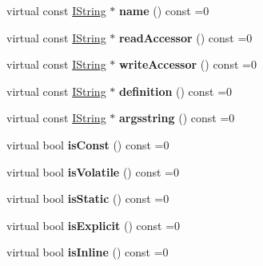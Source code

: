 \begin{DoxyCompactItemize}
\item 
\mbox{\label{class_i_member_a5407998f0ff9174fefa10fa3cbdd491a}} 
virtual const \mbox{\hyperlink{class_i_string}{I\+String}} $\ast$ {\bfseries name} () const =0
\item 
\mbox{\label{class_i_member_a4787d95f7dcd1e59e8de973bfd8fb39f}} 
virtual const \mbox{\hyperlink{class_i_string}{I\+String}} $\ast$ {\bfseries read\+Accessor} () const =0
\item 
\mbox{\label{class_i_member_a80f1ebc1bbbfa87ea9969dab464e8a55}} 
virtual const \mbox{\hyperlink{class_i_string}{I\+String}} $\ast$ {\bfseries write\+Accessor} () const =0
\item 
\mbox{\label{class_i_member_a919bc2bd4531f02c77ac43697ea34d90}} 
virtual const \mbox{\hyperlink{class_i_string}{I\+String}} $\ast$ {\bfseries definition} () const =0
\item 
\mbox{\label{class_i_member_aeee3310aaa39691c85f9e9017802f90b}} 
virtual const \mbox{\hyperlink{class_i_string}{I\+String}} $\ast$ {\bfseries argsstring} () const =0
\item 
\mbox{\label{class_i_member_a3c28cd31f2dfe490fb7dd6d27f958327}} 
virtual bool {\bfseries is\+Const} () const =0
\item 
\mbox{\label{class_i_member_aa1e4d1d60b70a0cfa0e2fe6fec9f4cbc}} 
virtual bool {\bfseries is\+Volatile} () const =0
\item 
\mbox{\label{class_i_member_a7eb70f5d8226e4c00a6abbeadaca9c94}} 
virtual bool {\bfseries is\+Static} () const =0
\item 
\mbox{\label{class_i_member_adbb42374989740c9307195d62859be33}} 
virtual bool {\bfseries is\+Explicit} () const =0
\item 
\mbox{\label{class_i_member_a6f009c22d804c702ebccc411c9843723}} 
virtual bool {\bfseries is\+Inline} () const =0
\item 
\mbox{\label{class_i_member_a6c43d4a96ebb1006e65c0e13b2f421bd}} 

\end{DoxyCompactItemize}
